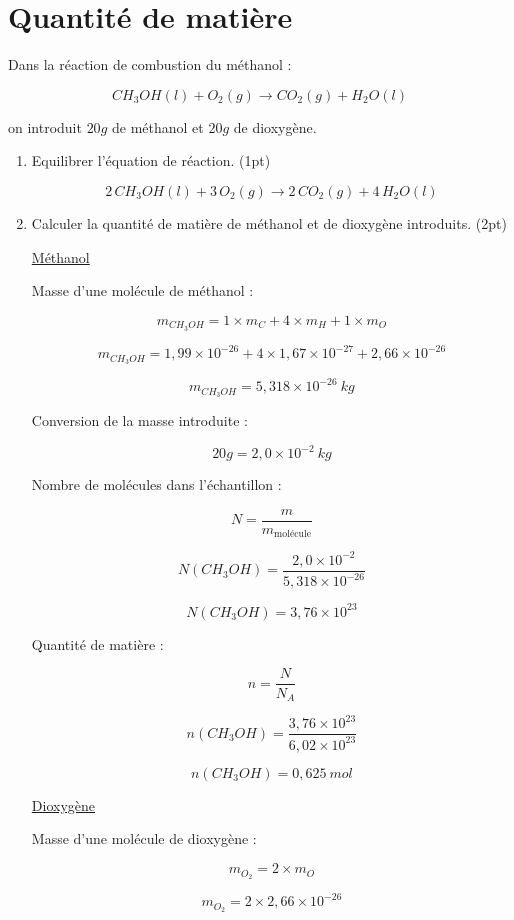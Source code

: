 \documentclass[a4paper,11pt,fleqn]{scrartcl}
\begin{document}
    \section{Quantité de matière}

Dans la réaction de combustion du méthanol :

\[
CH_3OH(l) + O_2(g) \rightarrow CO_2(g) + H_2O(l)
\]

on introduit $20g$ de méthanol et $20g$ de dioxygène.

\begin{enumerate}
    \item Equilibrer l’équation de réaction. (1pt)

    \[
    2\,CH_3OH(l) + 3\,O_2(g) \rightarrow 2\,CO_2(g) + 4\,H_2O(l)
    \]

    \item Calculer la quantité de matière de méthanol et de dioxygène introduits. (2pt)

    \underline{Méthanol}

    Masse d’une molécule de méthanol :

    \[
    m_{CH_3OH}=1\times m_C+4\times m_H+1\times m_O
    \]

    \[
    m_{CH_3OH}=1,99\times10^{-26}+4\times1,67\times10^{-27}+2,66\times10^{-26}
    \]

    \[
    m_{CH_3OH}=5,318\times10^{-26}~kg
    \]

    Conversion de la masse introduite :

    \[
    20g = 2,0\times10^{-2}~kg
    \]

    Nombre de molécules dans l’échantillon :

    \[
    N=\frac{m}{m_{\text{molécule}}}
    \]

    \[
    N(CH_3OH)=\frac{2,0\times10^{-2}}{5,318\times10^{-26}}
    \]

    \[
    N(CH_3OH)=3,76\times10^{23}
    \]

    Quantité de matière :

    \[
    n=\frac{N}{N_A}
    \]

    \[
    n(CH_3OH)=\frac{3,76\times10^{23}}{6,02\times10^{23}}
    \]

    \[
    n(CH_3OH)=0,625~mol
    \]

    \underline{Dioxygène}

    Masse d’une molécule de dioxygène :

    \[
    m_{O_2}=2\times m_O
    \]

    \[
    m_{O_2}=2\times2,66\times10^{-26}
    \]


\end{enumerate}
\end{document}
